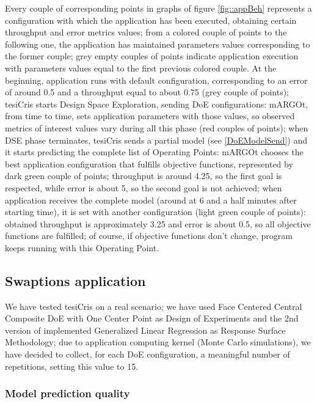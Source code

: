 Every couple of corresponding points in graphs of figure \ref{fig::appBeh} represents a configuration with which the application has been executed, obtaining certain throughput and error metrics values; from a colored couple of points to the following one, the application has maintained parameters values corresponding to the former couple; grey empty couples of points indicate application execution with parameters values equal to the first previous colored couple. At the beginning, application runs with default configuration, corresponding to an error of around 0.5 and a throughput equal to about 0.75 (grey couple of points); tesiCris starts Design Space Exploration, sending DoE configurations: mARGOt, from time to time, sets application parameters with those values, so observed metrics of interest values vary during all this phase (red couples of points); when DSE phase terminates, tesiCris sends a partial model (see \ref{DoEModelSend}) and it starts predicting the complete list of Operating Points: mARGOt chooses the best application configuration that fulfills objective functions, represented by dark green couple of points; throughput is around 4.25, so the first goal is respected, while error is about 5, so the second goal is not achieved; when application receives the complete model (around at 6 and a half minutes after starting time), it is set with another configuration (light green couple of points): obtained throughput is approximately 3.25 and error is about 0.5, so all objective functions are fulfilled; of course, if objective functions don't change, program keeps running with this Operating Point.




\subsection{Swaptions application}

We have tested tesiCris on a real scenario; we have used Face Centered Central Composite DoE with One Center Point as Design of Experiments and the 2nd version of implemented Generalized Linear Regression as Response Surface Methodology; due to application computing kernel (Monte Carlo simulations), we have decided to collect, for each DoE configuration, a meaningful number of repetitions, setting this value to 15.


\subsubsection{Model prediction quality}

